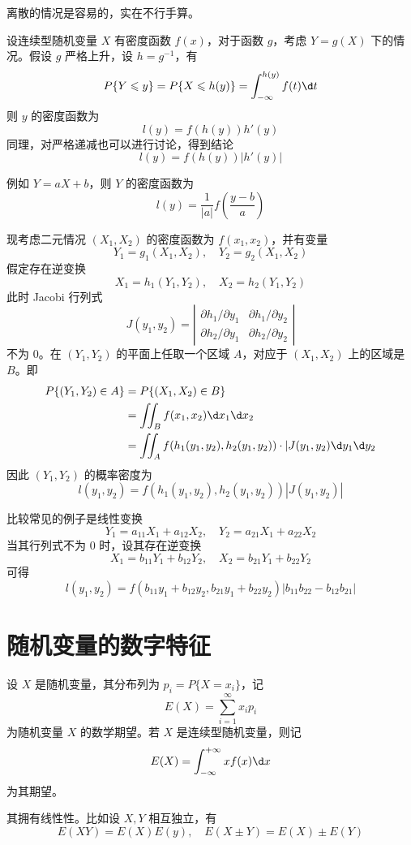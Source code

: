 离散的情况是容易的，实在不行手算。

设连续型随机变量 $X$ 有密度函数 $f(x)$，对于函数 $g$，考虑 $Y=g(X)$ 下的情况。假设 $g$ 严格上升，设 $h = g^{-1}$，有
\[ P\{Y \leqslant y\} = P\{X \leqslant h(y)\} = \int_{-\infty}^{h(y)} f(t) \d t \]
则 $y$ 的密度函数为
\[ l(y) = f(h(y)) h'(y) \]
同理，对严格递减也可以进行讨论，得到结论
\[ l(y) = f(h(y)) |h'(y)| \]

例如 $Y = aX+b$，则 $Y$ 的密度函数为
\[ l(y) = \frac{1}{|a|}f\left(\frac{y-b}{a}\right) \]

现考虑二元情况 $(X_1, X_2)$ 的密度函数为 $f(x_1, x_2)$，并有变量
\[ Y_1 = g_1(X_1, X_2), \quad Y_2 = g_2(X_1, X_2) \]
假定存在逆变换
\[ X_1 = h_1(Y_1, Y_2), \quad X_2 = h_2(Y_1, Y_2) \]
此时 Jacobi 行列式
\[ J(y_1, y_2) = \left|\begin{matrix}
	\partial h_1 / \partial y_1 & \partial h_1 / \partial y_2 \\
	\partial h_2 / \partial y_1 & \partial h_2 / \partial y_2
\end{matrix}\right| \]
不为 $0$。在 $(Y_1, Y_2)$ 的平面上任取一个区域 $A$，对应于 $(X_1, X_2)$ 上的区域是 $B$。即
\[ \begin{aligned}
	P\{(Y_1, Y_2) \in A\} &= P\{(X_1, X_2) \in B\} \\
	&= \iint_{B} f(x_1, x_2) \d x_1 \d x_2 \\
	&= \iint_{A} f(h_1(y_1, y_2), h_2(y_1, y_2)) \cdot |J(y_1, y_2) \d y_1 \d y_2
\end{aligned} \]
因此 $(Y_1, Y_2)$ 的概率密度为
\[ l(y_1, y_2) = f(h_1(y_1, y_2), h_2(y_1, y_2)) | J(y_1, y_2)| \]

比较常见的例子是线性变换
\[ Y_1 = a_{11} X_1 + a_{12} X_2, \quad Y_2 = a_{21} X_1 + a_{22} X_2 \]
当其行列式不为 $0$ 时，设其存在逆变换
\[ X_1 = b_{11} Y_1 + b_{12} Y_2, \quad X_2 = b_{21} Y_1 + b_{22} Y_2 \]
可得
\[ l(y_1, y_2) = f(b_{11} y_1 + b_{12} y_2, b_{21} y_1 + b_{22} y_2) | b_{11} b_{22} - b_{12} b_{21} | \]

\section{随机变量的数字特征}

设 $X$ 是随机变量，其分布列为 $p_i = P\{X = x_i\}$，记
\[ E(X) = \sum_{i=1}^\infty x_i p_i \]
为随机变量 $X$ 的数学期望。若 $X$ 是连续型随机变量，则记
\[ E(X) = \int_{-\infty}^{+\infty} x f(x) \d x \]
为其期望。

其拥有线性性。比如设 $X, Y$ 相互独立，有
\[ E(X Y) = E(X) E(y), \quad E(X \pm Y) = E(X) \pm E(Y) \]

